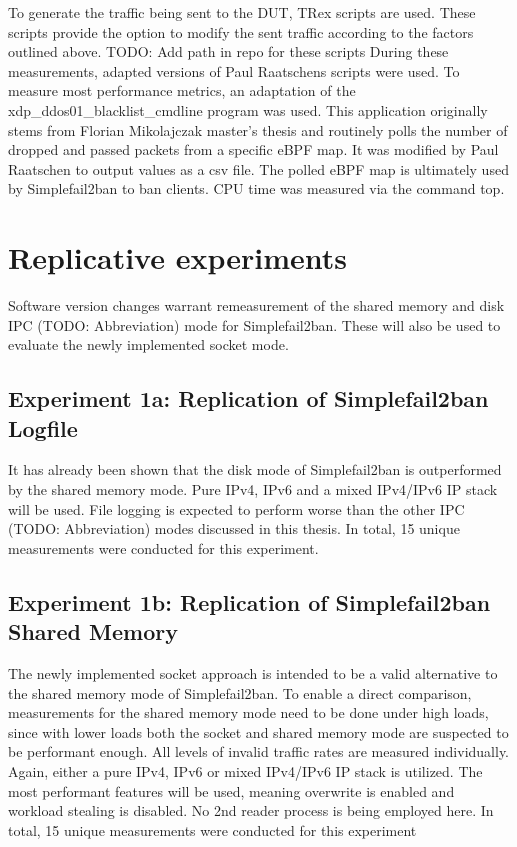 \bigskip
\noindent
To generate the traffic being sent to the DUT, TRex scripts are used.
These scripts provide the option to modify the sent traffic according to the factors outlined above. TODO: Add path in repo for these scripts
During these measurements, adapted versions of Paul Raatschens\cite{raatschen:ipc} scripts were used.
To measure most performance metrics, an adaptation of the xdp\_ddos01\_blacklist\_cmdline program was used.
This application originally stems from Florian Mikolajczak master's thesis\cite{mikolajczak:ebpf} and routinely polls the number of dropped and passed packets from a specific eBPF map.
It was modified by Paul Raatschen to output values as a csv file.
The polled eBPF map is ultimately used by Simplefail2ban to ban clients.
CPU time was measured via the command top.

\section{Replicative experiments}
Software version changes warrant remeasurement of the shared memory and disk IPC (TODO: Abbreviation) mode for Simplefail2ban.
These will also be used to evaluate the newly implemented socket mode.

\subsection{Experiment 1a: Replication of Simplefail2ban Logfile}
It has already been shown that the disk mode of Simplefail2ban is outperformed by the shared memory mode.
Pure IPv4, IPv6 and a mixed IPv4/IPv6 IP stack will be used.
File logging is expected to perform worse than the other IPC (TODO: Abbreviation) modes discussed in this thesis.
In total, 15 unique measurements were conducted for this experiment.

\subsection{Experiment 1b: Replication of Simplefail2ban Shared Memory}
The newly implemented socket approach is intended to be a valid alternative to the shared memory mode of Simplefail2ban.
To enable a direct comparison, measurements for the shared memory mode need to be done under high loads, since with lower loads both the socket and shared memory mode are suspected to be performant enough.
All levels of invalid traffic rates are measured individually.
Again, either a pure IPv4, IPv6 or mixed IPv4/IPv6 IP stack is utilized.
The most performant features will be used, meaning overwrite is enabled and workload stealing is disabled.
No 2nd reader process is being employed here.
In total, 15 unique measurements were conducted for this experiment

